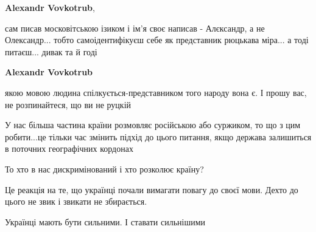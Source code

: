 \begin{itemize}
\begin{itemize}
\textbf{Alexandr Vovkotrub}, 

сам писав московітською ізиком і ім'я своє написав - Алєксандр, а не
Олександр... тобто самоідентифікуєш себе як представник рюцькава міра... а тоді
питаєш... дивак та й годі


 
\textbf{Alexandr Vovkotrub} 

якою мовою людина спілкується-представником того народу вона є. І прошу вас, не
розпинайтеся, що ви не руцкій 

\end{itemize}

 

У нас більша частина країни розмовляє російською або суржиком, то що з цим
робити...це тільки час змінить підхід до цього питання, якщо держава залишиться в
поточних географічних кордонах


 
То хто в нас дискримінований і хто розколює країну?

 
Це реакція на те, що українці почали вимагати повагу до своєї мови. Дехто до цього не звик і звикати не збирається.

 
Українці мають бути сильними. І ставати сильнішими


\end{itemize}
